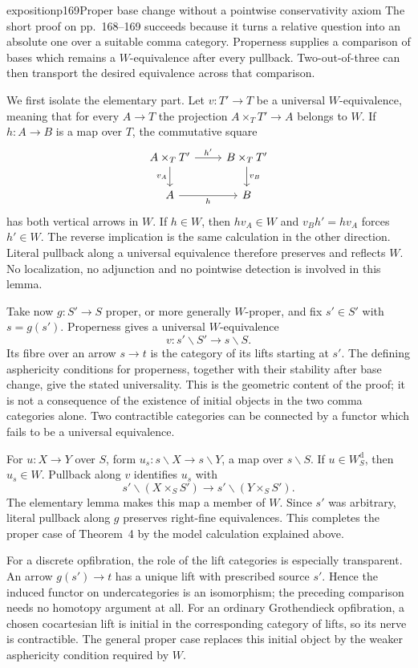 \begin{dcomment}{exposition}{p169}{Proper base change without a pointwise conservativity axiom}
The short proof on pp.~168--169 succeeds because it turns a relative question into an absolute one over a suitable comma category. Properness supplies a comparison of bases which remains a $W$-equivalence after every pullback. Two-out-of-three can then transport the desired equivalence across that comparison.

We first isolate the elementary part. Let $v:T'\to T$ be a universal $W$-equivalence, meaning that for every $A\to T$ the projection $A\times_TT'\to A$ belongs to $W$. If $h:A\to B$ is a map over $T$, the commutative square
\[
\begin{tikzcd}
 A\times_TT' \arrow[r,"h'"]\arrow[d,"v_A"']&
 B\times_TT'\arrow[d,"v_B"]\\
 A\arrow[r,"h"']&B
\end{tikzcd}
\]
has both vertical arrows in $W$. If $h\in W$, then $hv_A\in W$ and $v_Bh'=hv_A$ forces $h'\in W$. The reverse implication is the same calculation in the other direction. Literal pullback along a universal equivalence therefore preserves and reflects $W$. No localization, no adjunction and no pointwise detection is involved in this lemma.

Take now $g:S'\to S$ proper, or more generally $W$-proper, and fix $s'\in S'$ with $s=g(s')$. Properness gives a universal $W$-equivalence
\[
 v:s'\backslash S'\longrightarrow s\backslash S.
\]
Its fibre over an arrow $s\to t$ is the category of its lifts starting at $s'$. The defining asphericity conditions for properness, together with their stability after base change, give the stated universality. This is the geometric content of the proof; it is not a consequence of the existence of initial objects in the two comma categories alone. Two contractible categories can be connected by a functor which fails to be a universal equivalence.

For $u:X\to Y$ over $S$, form $u_s:s\backslash X\to s\backslash Y$, a map over $s\backslash S$. If $u\in W_S^{\mathrm d}$, then $u_s\in W$. Pullback along $v$ identifies $u_s$ with
\[
 s'\backslash(X\times_SS')\longrightarrow
 s'\backslash(Y\times_SS').
\]
The elementary lemma makes this map a member of $W$. Since $s'$ was arbitrary, literal pullback along $g$ preserves right-fine equivalences. This completes the proper case of Theorem~4 by the model calculation explained above.

For a discrete opfibration, the role of the lift categories is especially transparent. An arrow $g(s')\to t$ has a unique lift with prescribed source $s'$. Hence the induced functor on undercategories is an isomorphism; the preceding comparison needs no homotopy argument at all. For an ordinary Grothendieck opfibration, a chosen cocartesian lift is initial in the corresponding category of lifts, so its nerve is contractible. The general proper case replaces this initial object by the weaker asphericity condition required by $W$.


\end{dcomment}
